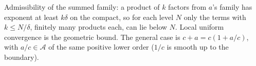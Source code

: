 Admissibility of the summed family: a product of $k$ factors from $a$'s family has exponent at least $k\delta$ on the compact, so for each level $N$ only the terms with $k \leq N/\delta$, finitely many products each, can lie below $N$. Local uniform convergence is the geometric bound. The general case is $c + a = c(1 + a/c)$, with $a/c \in \mathcal{A}$ of the same positive lower order ($1/c$ is smooth up to the boundary).

